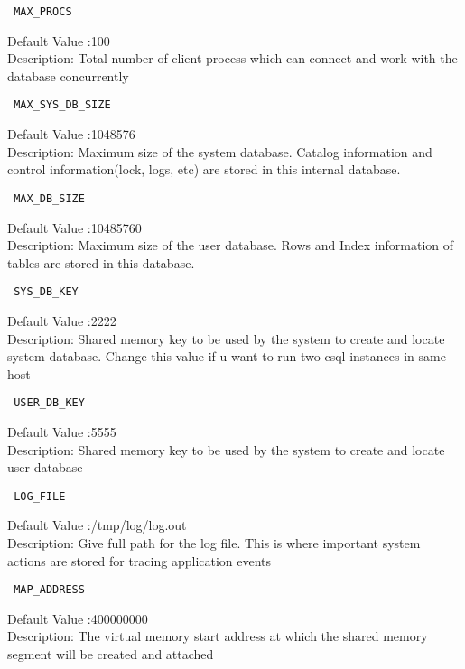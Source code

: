\documentclass[12pt]{article}
\begin{document}
\begin{verbatim} MAX_PROCS \end{verbatim}
Default Value :100 \\
Description: Total number of client process which can connect and work with the database concurrently \\

\begin{verbatim} MAX_SYS_DB_SIZE \end{verbatim}
Default Value :1048576 \\
Description: Maximum size of the system database. Catalog information and control information(lock, logs, etc) are stored in this internal database. \\

\begin{verbatim} MAX_DB_SIZE \end{verbatim}
Default Value :10485760 \\
Description: Maximum size of the user database. Rows and Index information of tables are stored in this database.\\


\begin{verbatim} SYS_DB_KEY \end{verbatim}
Default Value :2222 \\
Description: Shared memory key to be used by the system to create and locate system database. Change this value if u want to run two csql instances in same host \\

\begin{verbatim} USER_DB_KEY \end{verbatim}
Default Value :5555 \\
Description: Shared memory key to be used by the system to create and locate user database \\

\begin{verbatim} LOG_FILE \end{verbatim}
Default Value :/tmp/log/log.out \\
Description: Give full path for the log file. This is  where important system actions are stored for tracing application events\\


\begin{verbatim} MAP_ADDRESS \end{verbatim}
Default Value :400000000 \\
Description: The virtual memory start address at which the shared memory segment will be created and attached\\
\end{document}
